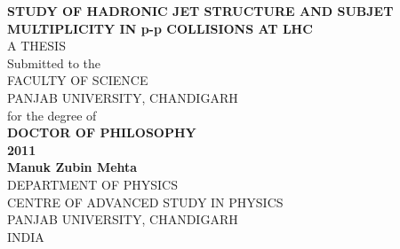 {
\pagestyle{empty}
\begin{center}
\renewcommand{\rmdefault}{phv} %
{\fontsize{14}{16}\sf \bf STUDY OF HADRONIC JET STRUCTURE AND SUBJET MULTIPLICITY IN p-p COLLISIONS AT LHC}
\\ [3.8cm]

{\fontsize{12}{14} \sf A THESIS} \\
\vspace{0.3cm}
{ \sf Submitted to the \\
{\fontsize{12}{14} FACULTY OF SCIENCE \\
PANJAB UNIVERSITY, CHANDIGARH \\ }
for the degree of }\\
\vspace{0.5cm}
{\fontsize{14}{16}  \bf DOCTOR OF PHILOSOPHY}\\ [2.0cm]
{\fontsize{14}{16} \sf \textbf{2011}} \\[2.0cm]
{\fontsize{14}{16} \bf Manuk Zubin Mehta}\\[1.25cm]
{\fontsize{12}{14} \sf DEPARTMENT OF PHYSICS \\
CENTRE OF ADVANCED STUDY IN PHYSICS\\
PANJAB UNIVERSITY, CHANDIGARH\\
INDIA}
\end{center}

}
